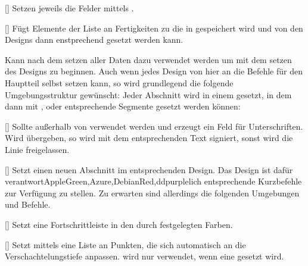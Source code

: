%
%
%

[\cmdlist{}\cmdlist{}\cmdlist\secline{}\cmdlist{}\cmdlist{}\cmdlist{}]
Setzen jeweils die Felder mittels .

%
%
%

[\cmdlist{}]
Fügt Elemente der Liste an Fertigkeiten zu die in  gespeichert wird und von den Designs dann enstprechend gesetzt werden kann.

%
%
%

Kann nach dem setzen aller Daten dazu verwendet werden um mit dem setzen des Designs zu beginnen. Auch wenn jedes Design von hier an die Befehle für den Hauptteil selbst setzen kann, so wird grundlegend die folgende Umgebungsstruktur gewünscht: Jeder Abschnitt wird in einem  gesetzt, in dem dann mit ,  oder  entsprechende Segmente gesetzt werden können:

%
%
%

[]
Sollte außerhalb von  verwendet werden und erzeugt ein Feld für Unterschriften. Wird  übergeben, so wird mit dem entsprechenden Text signiert, sonst wird die Linie freigelassen.

%
%
%

[]
Setzt einen neuen Abschnitt im entsprechenden Design. Das Design ist dafür verantwortAppleGreen,Azure,DebianRed,ddpurplelich entsprechende Kurzbefehle zur Verfügung zu stellen. Zu erwarten sind allerdings die folgenden Umgebungen und Befehle.

%
%
%

[]
Setzt eine Fortschrittleiste in den durch  festgelegten Farben.

%
%
%

[]
Setzt mittels  eine Liste an Punkten, die sich automatisch an die Verschachtelungstiefe anpassen.  wird nur verwendet, wenn eine  gesetzt wird.

